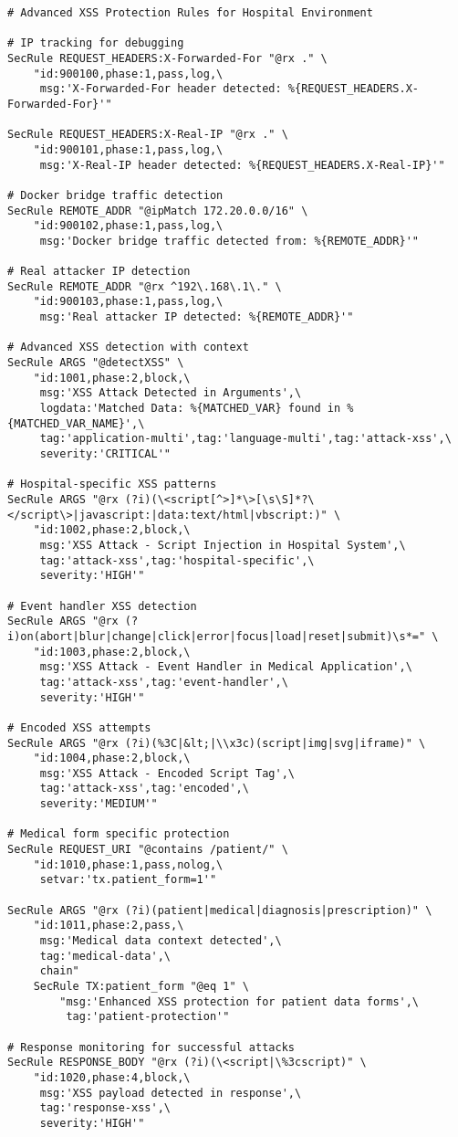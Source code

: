\begin{lstlisting}[caption=Regles ModSecurity pour protection XSS avancee]
# Advanced XSS Protection Rules for Hospital Environment

# IP tracking for debugging
SecRule REQUEST_HEADERS:X-Forwarded-For "@rx ." \
    "id:900100,phase:1,pass,log,\
     msg:'X-Forwarded-For header detected: %{REQUEST_HEADERS.X-Forwarded-For}'"

SecRule REQUEST_HEADERS:X-Real-IP "@rx ." \
    "id:900101,phase:1,pass,log,\
     msg:'X-Real-IP header detected: %{REQUEST_HEADERS.X-Real-IP}'"

# Docker bridge traffic detection
SecRule REMOTE_ADDR "@ipMatch 172.20.0.0/16" \
    "id:900102,phase:1,pass,log,\
     msg:'Docker bridge traffic detected from: %{REMOTE_ADDR}'"

# Real attacker IP detection
SecRule REMOTE_ADDR "@rx ^192\.168\.1\." \
    "id:900103,phase:1,pass,log,\
     msg:'Real attacker IP detected: %{REMOTE_ADDR}'"

# Advanced XSS detection with context
SecRule ARGS "@detectXSS" \
    "id:1001,phase:2,block,\
     msg:'XSS Attack Detected in Arguments',\
     logdata:'Matched Data: %{MATCHED_VAR} found in %{MATCHED_VAR_NAME}',\
     tag:'application-multi',tag:'language-multi',tag:'attack-xss',\
     severity:'CRITICAL'"

# Hospital-specific XSS patterns
SecRule ARGS "@rx (?i)(\<script[^>]*\>[\s\S]*?\</script\>|javascript:|data:text/html|vbscript:)" \
    "id:1002,phase:2,block,\
     msg:'XSS Attack - Script Injection in Hospital System',\
     tag:'attack-xss',tag:'hospital-specific',\
     severity:'HIGH'"

# Event handler XSS detection
SecRule ARGS "@rx (?i)on(abort|blur|change|click|error|focus|load|reset|submit)\s*=" \
    "id:1003,phase:2,block,\
     msg:'XSS Attack - Event Handler in Medical Application',\
     tag:'attack-xss',tag:'event-handler',\
     severity:'HIGH'"

# Encoded XSS attempts
SecRule ARGS "@rx (?i)(%3C|&lt;|\\x3c)(script|img|svg|iframe)" \
    "id:1004,phase:2,block,\
     msg:'XSS Attack - Encoded Script Tag',\
     tag:'attack-xss',tag:'encoded',\
     severity:'MEDIUM'"

# Medical form specific protection
SecRule REQUEST_URI "@contains /patient/" \
    "id:1010,phase:1,pass,nolog,\
     setvar:'tx.patient_form=1'"

SecRule ARGS "@rx (?i)(patient|medical|diagnosis|prescription)" \
    "id:1011,phase:2,pass,\
     msg:'Medical data context detected',\
     tag:'medical-data',\
     chain"
    SecRule TX:patient_form "@eq 1" \
        "msg:'Enhanced XSS protection for patient data forms',\
         tag:'patient-protection'"

# Response monitoring for successful attacks
SecRule RESPONSE_BODY "@rx (?i)(\<script|\%3cscript)" \
    "id:1020,phase:4,block,\
     msg:'XSS payload detected in response',\
     tag:'response-xss',\
     severity:'HIGH'"
\end{lstlisting}

